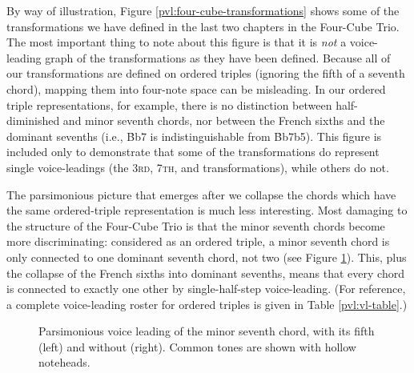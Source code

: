 By way of illustration, Figure \ref{pvl:four-cube-transformations} shows some
of the transformations we have defined in the last two chapters in the
Four-Cube Trio. The most important thing to note about this figure is that it
is \emph{not} a voice-leading graph of the transformations as they have been
defined. Because all of our transformations are defined on ordered triples
(ignoring the fifth of a seventh chord), mapping them into four-note space can
be misleading. In our ordered triple representations, for example, there is no
distinction between half-diminished and minor seventh chords, nor between the
French sixths and the dominant sevenths (i.e., \h{Bb7} is indistinguishable
from \h{Bb7b5}). This figure is included only to demonstrate that some of the
transformations do represent single voice-leadings (the \textsc{3rd},
\textsc{7th}, and \slideS transformations), while others do not.

The parsimonious picture that emerges after we collapse the chords which have
the same ordered-triple representation is much less interesting.
Most damaging to the structure of the Four-Cube Trio is that the minor seventh
chords become more discriminating: considered as an ordered triple, a minor
seventh chord is only connected to one dominant seventh chord, not two (see
Figure \ref{pvl:minor-seventh-parsimony}). This, plus the collapse of the
French sixths into dominant sevenths, means that every chord is connected to
exactly one other by single-half-step voice-leading. (For reference, a
complete voice-leading roster for ordered triples is given in Table
\ref{pvl:vl-table}.)

\begin{figure}[tbp]
  \caption[Parsimonious voice leading of the minor seventh
    chord.]{Parsimonious voice leading of the minor seventh chord, with its
      fifth (left) and without (right). Common tones are shown with hollow noteheads.}
  \label{pvl:minor-seventh-parsimony}
\end{figure}

